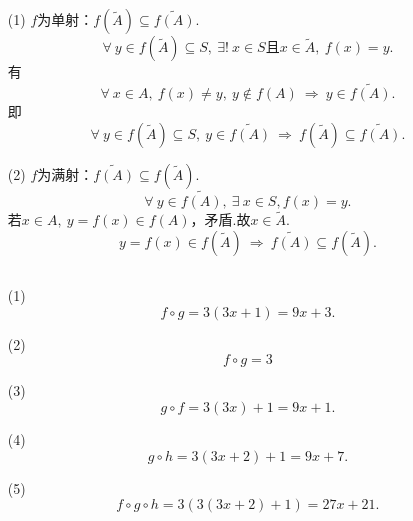 \documentclass[UTF8]{ctexart}
\begin{document}
\subsection{}   %
\begin{enumerate}
    \item [(1)]$f$为单射：$f(\widetilde{A})\subseteq \widetilde{f(A)}$.
    \[
        \forall\ y\in f(\widetilde{A}) \subseteq S,\ 
        \exists !\ x\in S\mbox{且} x\in \widetilde{A},\ f(x)=y.  
    \]
    有
    \[
        \forall\ x\in A,\ f(x)\neq y,\ y\notin f(A) 
        \ \Rightarrow\ 
        y\in \widetilde{f(A)}. 
    \]
    即
    \[
        \forall\ y\in f(\widetilde{A}) \subseteq S,\ 
        y\in \widetilde{f(A)}
        \ \Rightarrow\ 
        f(\widetilde{A})\subseteq \widetilde{f(A)}.
    \]
    \item [(2)]$f$为满射：$\widetilde{f(A)}\subseteq f(\widetilde{A})$.
    \[
        \forall\ y\in \widetilde{f(A)},\ 
        \exists\ x\in S,f(x)=y.    
    \]
    若$x\in A,\ y=f(x)\in f(A)$，矛盾.故$x\in \widetilde{A}$.
    \[
        y=f(x)\in f(\widetilde{A})
        \ \Rightarrow\ 
        \widetilde{f(A)}\subseteq f(\widetilde{A}).
    \]
\end{enumerate}

\subsection{}   %
\begin{enumerate}
    \item [(1)]
    \[
        f\circ g
        =
        3(3x+1)
        =
        9x+3.
    \]
    \item [(2)]
    \[
        f\circ g
        =
        3    
    \]
    \item [(3)]
    \[
        g\circ f
        =
        3(3x)+1
        =
        9x+1.
    \]
    \item [(4)]
    \[
        g\circ h
        =
        3(3x+2)+1
        =
        9x+7.
    \]
    \item [(5)]
    \[
        f\circ g \circ h
        =
        3(3(3x+2)+1)
        =
        27x+21.   
    \]
\end{enumerate}
\end{document}
